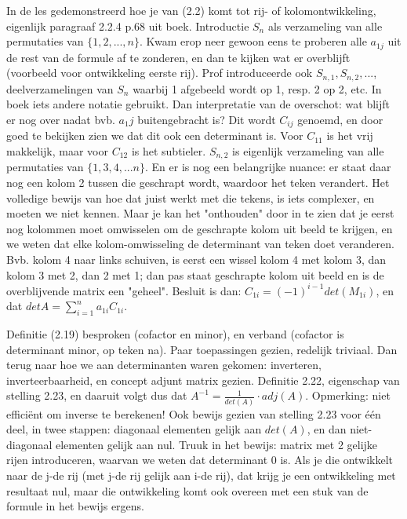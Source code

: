 \documentclass{article}
\begin{document}
In de les gedemonstreerd hoe je van (2.2) komt tot rij- of kolomontwikkeling, eigenlijk paragraaf 2.2.4 p.68 uit boek. Introductie $S_n$ als verzameling van alle permutaties van $\{1,2,...,n\}$. Kwam erop neer gewoon eens te proberen alle $a_{1j}$ uit de rest van de formule af te zonderen, en dan te kijken wat er overblijft (voorbeeld voor ontwikkeling eerste rij). Prof introduceerde ook $S_{n,1}, S_{n,2},...$, deelverzamelingen van $S_n$ waarbij 1 afgebeeld wordt op 1, resp. 2 op 2, etc. In boek iets andere notatie gebruikt. Dan interpretatie van de overschot: wat blijft er nog over nadat bvb. $a_1j$ buitengebracht is? Dit wordt $C_{ij}$ genoemd, en door goed te bekijken zien we dat dit ook een determinant is. Voor $C_{11}$ is het vrij makkelijk, maar voor $C_{12}$ is het subtieler. $S_{n,2}$ is eigenlijk verzameling van alle permutaties van $\{1,3,4,...n\}$. En er is nog een belangrijke nuance: er staat daar nog een kolom 2 tussen die geschrapt wordt, waardoor het teken verandert. Het volledige bewijs van hoe dat juist werkt met die tekens, is iets complexer, en moeten we niet kennen. Maar je kan het "onthouden" door in te zien dat je eerst nog kolommen moet omwisselen om de geschrapte kolom uit beeld te krijgen, en we weten dat elke kolom-omwisseling de determinant van teken doet veranderen. Bvb. kolom 4 naar links schuiven, is eerst een wissel kolom 4 met kolom 3, dan kolom 3 met 2, dan 2 met 1; dan pas staat geschrapte kolom uit beeld en is de overblijvende matrix een "geheel". 
Besluit is dan: $C_{1i} = (-1)^{i-1} det (M_{1i})$, en dat $det A=  \sum_{i=1}^{n} a_{1i}C_{1i}$. 

Definitie (2.19) besproken (cofactor en minor), en verband (cofactor is determinant minor, op teken na). Paar toepassingen gezien, redelijk triviaal. Dan terug naar hoe we aan determinanten waren gekomen: inverteren, inverteerbaarheid, en concept adjunt matrix gezien. Definitie 2.22, eigenschap van stelling 2.23, en daaruit volgt dus dat $A^{-1}= \frac{1}{det(A)} \cdot adj(A)$. Opmerking: niet effici\"ent om inverse te berekenen! Ook bewijs gezien van stelling 2.23 voor \'e\'en deel, in twee stappen: diagonaal elementen gelijk aan $det(A)$, en dan niet-diagonaal elementen gelijk aan nul. Truuk in het bewijs: matrix met 2 gelijke rijen introduceren, waarvan we weten dat determinant 0 is. Als je die ontwikkelt naar de j-de rij (met j-de rij gelijk aan i-de rij), dat krijg je een ontwikkeling met resultaat nul, maar die ontwikkeling komt ook overeen met een stuk van de formule in het bewijs ergens. 
\end{document}

